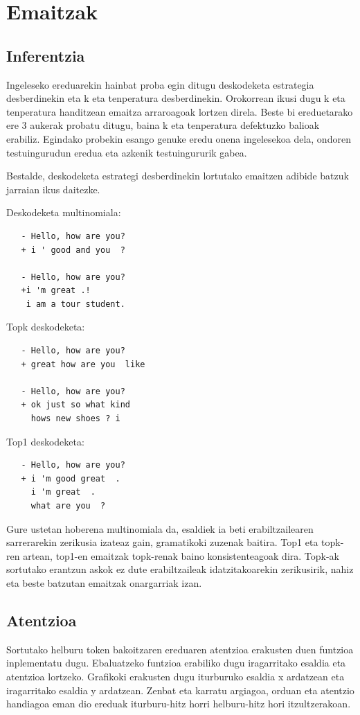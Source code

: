 \documentclass[11pt,a4paper]{article}
\begin{document}
\section{Emaitzak}

\subsection{Inferentzia}

Ingeleseko ereduarekin hainbat proba egin ditugu deskodeketa estrategia desberdinekin eta k eta tenperatura desberdinekin. Orokorrean ikusi dugu k eta tenperatura handitzean emaitza arraroagoak lortzen direla. Beste bi ereduetarako ere 3 aukerak probatu ditugu, baina k eta tenperatura defektuzko balioak erabiliz. Egindako probekin esango genuke eredu onena ingelesekoa dela, ondoren testuingurudun eredua eta azkenik testuingururik gabea.

Bestalde, deskodeketa estrategi desberdinekin lortutako emaitzen adibide batzuk jarraian ikus daitezke.

Deskodeketa multinomiala:
\begin{verbatim}
   - Hello, how are you?
   + i ' good and you  ?
   
   - Hello, how are you?
   +i 'm great .! 
    i am a tour student.
\end{verbatim}

Topk deskodeketa:
\begin{verbatim}
   - Hello, how are you?
   + great how are you  like
   
   - Hello, how are you?
   + ok just so what kind 
     hows new shoes ? i

\end{verbatim}

Top1 deskodeketa:
\begin{verbatim}
   - Hello, how are you?
   + i 'm good great  .  
     i 'm great  .  
     what are you  ?
\end{verbatim}

Gure ustetan hoberena multinomiala da, esaldiek ia beti erabiltzailearen sarrerarekin zerikusia izateaz gain, gramatikoki zuzenak baitira. Top1 eta topk-ren artean, top1-en emaitzak topk-renak baino konsistenteagoak dira. Topk-ak sortutako erantzun askok ez dute erabiltzaileak idatzitakoarekin zerikusirik, nahiz eta beste batzutan emaitzak onargarriak izan. 

\subsection{Atentzioa}
Sortutako helburu token bakoitzaren ereduaren atentzioa erakusten duen funtzioa inplementatu dugu. Ebaluatzeko funtzioa erabiliko dugu iragarritako esaldia eta atentzioa lortzeko. Grafikoki erakusten dugu iturburuko esaldia x ardatzean eta iragarritako esaldia y ardatzean. Zenbat eta karratu argiagoa, orduan eta atentzio handiagoa eman dio ereduak iturburu-hitz horri helburu-hitz hori itzultzerakoan.
\end{document}

